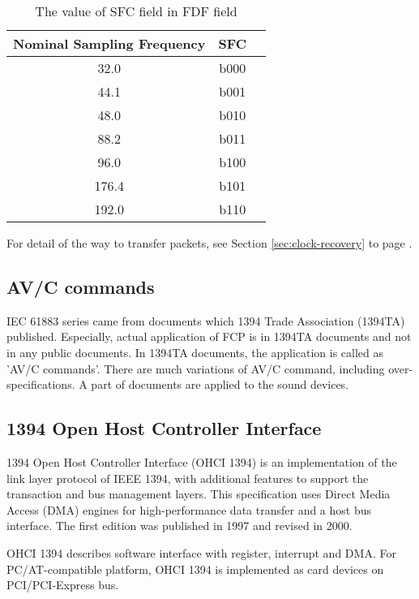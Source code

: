 \documentclass[onecolumn]{article}
\begin{document}
\begin{table}[H]
	\centering
	\caption{{The value of SFC field in FDF field}}
	\label{tbl:sfc-fdf}
	\begin{tabular}{ccc} \toprule
		Nominal Sampling Frequency & SFC \\ \midrule
		32.0	& b000 \\
		44.1	& b001 \\
		48.0	& b010 \\
		88.2	& b011 \\
		96.0	& b100 \\
		176.4	& b101 \\
		192.0	& b110 \\ \bottomrule
	\end{tabular}
\end{table}

For detail of the way to transfer packets, see Section \ref{sec:clock-recovery} to page \pageref{sec:clock-recovery}.

\subsection{AV/C commands}

IEC 61883 series came from documents which 1394 Trade Association (1394TA) published. Especially, actual application of FCP is in 1394TA documents and not in any public documents. In 1394TA documents, the application is called as 'AV/C commands'. There are much variations of AV/C command, including over-specifications. A part of documents are applied to the sound devices\cite{avc-general-4-2, avc-audio-1, avc-connection-1, avc-music-1, avc-descriptor-1, avc-info-block-1, avc-general-enhancement, avc-stream-format-1, avc-stream-format-1-1, avc-rate-control}.

\subsection{1394 Open Host Controller Interface}
\label{ohci-1394}

1394 Open Host Controller Interface (OHCI 1394) is an implementation of the link layer protocol of IEEE 1394, with additional features to support the transaction and bus management layers. This specification uses Direct Media Access (DMA) engines for high-performance data transfer and a host bus interface. The first edition was published in 1997\cite{ohci1394-1} and revised in 2000\cite{ohci1394-1-1}.

OHCI 1394 describes software interface with register, interrupt and DMA. For PC/AT-compatible platform, OHCI 1394 is implemented as card devices on PCI/PCI-Express bus.
\end{document}
